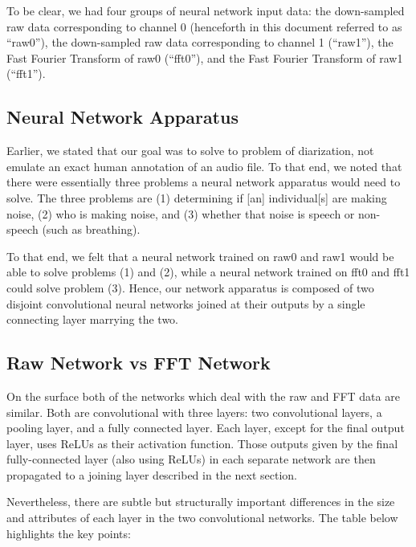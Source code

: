 \documentclass[11pt]{article}
\begin{document}
To be clear, we had four groups of neural network input data: the down-sampled raw data corresponding to channel 0 (henceforth in this document referred to as ``raw0''), the down-sampled raw data corresponding to channel 1 (``raw1''), the Fast Fourier Transform of raw0 (``fft0''), and the Fast Fourier Transform of raw1 (``fft1'').

\subsection{Neural Network Apparatus}
Earlier, we stated that our goal was to solve to problem of diarization, not emulate an exact human annotation of an audio file. To that end, we noted that there were essentially three problems a neural network apparatus would need to solve. The three problems are (1) determining if [an] individual[s] are making noise, (2) who is making noise, and (3) whether that noise is speech or non-speech (such as breathing). 

To that end, we felt that a neural network trained on raw0 and raw1 would be able to solve problems (1) and (2), while a neural network trained on fft0 and fft1 could solve problem (3). Hence, our network apparatus is composed of two disjoint convolutional neural networks joined at their outputs by a single connecting layer marrying the two. 

\subsection{Raw Network vs FFT Network}
On the surface both of the networks which deal with the raw and FFT data are similar. Both are convolutional with three layers: two convolutional layers, a pooling layer, and a fully connected layer. Each layer, except for the final output layer, uses ReLUs as their activation function. Those outputs given by the final fully-connected layer (also using ReLUs) in each separate network are then propagated to a joining layer described in the next section.

Nevertheless, there are subtle but structurally important differences in the size and attributes of each layer in the two convolutional networks. The table below highlights the key points:
\end{document}
